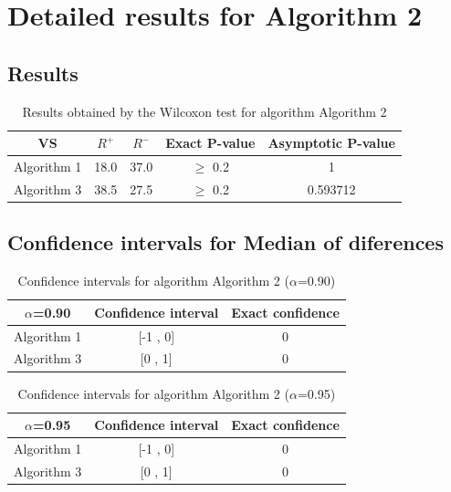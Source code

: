 \documentclass[a4paper,10pt]{article}
\begin{document}
 \clearpage 


\section{Detailed results for Algorithm 2}


\subsection{Results}

\begin{table}[!htp]
\centering\small
\begin{tabular}{
|c|c|c|c|c|}
\hline
 VS & $R^{+}$ & $R^{-}$ & Exact P-value & Asymptotic P-value \\ \hline 
Algorithm 1 & 18.0 & 37.0 & $\geq$ 0.2 & 1\\ \hline 
Algorithm 3 & 38.5 & 27.5 & $\geq$ 0.2 & 0.593712\\ \hline 

\end{tabular}
\caption{Results obtained by the Wilcoxon test for algorithm Algorithm 2}
\end{table}

\subsection{Confidence intervals for Median of diferences}

\begin{table}[!htp]
\centering\small
\begin{tabular}{
|c|c|c|}
\hline
 $\alpha$=0.90 & Confidence interval & Exact confidence \\ \hline 
Algorithm 1 & [-1 , 0] & 0\\ \hline 
Algorithm 3 & [0 , 1] & 0\\ \hline 

\end{tabular}
\caption{Confidence intervals for algorithm Algorithm 2 ($\alpha$=0.90)}
\end{table}
\begin{table}[!htp]
\centering\small
\begin{tabular}{
|c|c|c|}
\hline
 $\alpha$=0.95 & Confidence interval & Exact confidence \\ \hline 
Algorithm 1 & [-1 , 0] & 0\\ \hline 
Algorithm 3 & [0 , 1] & 0\\ \hline 

\end{tabular}
\caption{Confidence intervals for algorithm Algorithm 2 ($\alpha$=0.95)}
\end{table}
\end{document}
